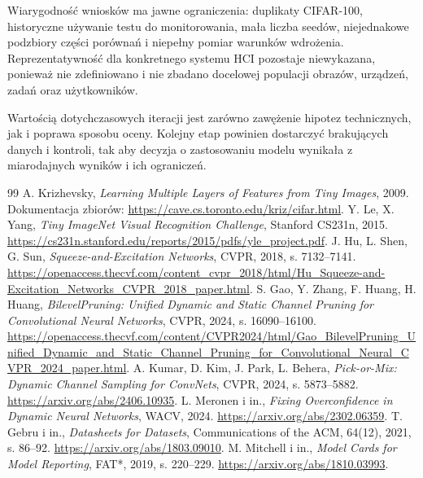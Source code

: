 \documentclass[12pt,a4paper]{article}
\begin{document}
Wiarygodność wniosków ma jawne ograniczenia: duplikaty CIFAR-100,
historyczne używanie testu do monitorowania, mała liczba seedów,
niejednakowe podzbiory części porównań i niepełny pomiar warunków wdrożenia.
Reprezentatywność dla konkretnego systemu HCI pozostaje niewykazana,
ponieważ nie zdefiniowano i nie zbadano docelowej populacji obrazów,
urządzeń, zadań oraz użytkowników.

Wartością dotychczasowych iteracji jest zarówno zawężenie hipotez
technicznych, jak i poprawa sposobu oceny. Kolejny etap powinien dostarczyć
brakujących danych i kontroli, tak aby decyzja o zastosowaniu modelu
wynikała z miarodajnych wyników i ich ograniczeń.

\begin{thebibliography}{99}
 A. Krizhevsky, \emph{Learning Multiple Layers of Features
from Tiny Images}, 2009. Dokumentacja zbiorów:
\url{https://cave.cs.toronto.edu/kriz/cifar.html}.
 Y. Le, X. Yang, \emph{Tiny ImageNet Visual Recognition
Challenge}, Stanford CS231n, 2015.
\url{https://cs231n.stanford.edu/reports/2015/pdfs/yle_project.pdf}.
 J. Hu, L. Shen, G. Sun,
\emph{Squeeze-and-Excitation Networks}, CVPR, 2018, s. 7132--7141.
\url{https://openaccess.thecvf.com/content_cvpr_2018/html/Hu_Squeeze-and-Excitation_Networks_CVPR_2018_paper.html}.
 S. Gao, Y. Zhang, F. Huang, H. Huang,
\emph{BilevelPruning: Unified Dynamic and Static Channel Pruning for
Convolutional Neural Networks}, CVPR, 2024, s. 16090--16100.
\url{https://openaccess.thecvf.com/content/CVPR2024/html/Gao_BilevelPruning_Unified_Dynamic_and_Static_Channel_Pruning_for_Convolutional_Neural_CVPR_2024_paper.html}.
 A. Kumar, D. Kim, J. Park, L. Behera,
\emph{Pick-or-Mix: Dynamic Channel Sampling for ConvNets}, CVPR, 2024,
s. 5873--5882. \url{https://arxiv.org/abs/2406.10935}.
 L. Meronen i in.,
\emph{Fixing Overconfidence in Dynamic Neural Networks}, WACV, 2024.
\url{https://arxiv.org/abs/2302.06359}.
 T. Gebru i in., \emph{Datasheets for Datasets},
Communications of the ACM, 64(12), 2021, s. 86--92.
\url{https://arxiv.org/abs/1803.09010}.
 M. Mitchell i in., \emph{Model Cards for Model Reporting},
FAT*, 2019, s. 220--229. \url{https://arxiv.org/abs/1810.03993}.
\end{thebibliography}
\end{document}
